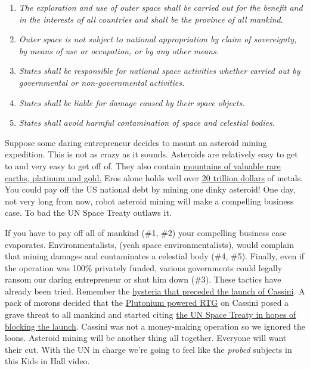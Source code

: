 \begin{enumerate}
\item
  \emph{The exploration and use of outer space shall be carried out for
  the benefit and in the interests of all countries and shall be the
  province of all mankind}.
\item
  \emph{Outer space is not subject to national appropriation by claim of
  sovereignty, by means of use or occupation, or by any other means.}
\item
  \emph{States shall be responsible for national space activities
  whether carried out by governmental or non-governmental activities.}
\item
  \emph{States shall be liable for damage caused by their space
  objects.}
\item
  \emph{States shall avoid harmful contamination of space and celestial
  bodies.}
\end{enumerate}
Suppose some daring entrepreneur decides to mount an asteroid mining
expedition. This is not as crazy as it sounds. Asteroids are relatively
easy to get to and very easy to get off of. They also contain
\href{http://news.bbc.co.uk/2/hi/sci/tech/401227.stm}{mountains of
valuable rare earths, platinum and gold.} Eros alone holds well over
\href{http://www.suite101.com/content/economic-impact-of-asteroids-space-exploration-a187015}{20
trillion dollars} of metals. You could pay off the US national debt by
mining one dinky asteroid! One day, not very long from now, robot
asteroid mining will make a compelling business case. To bad the UN
Space Treaty outlaws it.

If you have to pay off all of mankind (\#1, \#2) your compelling
business case evaporates. Environmentalists, (yeah space
environmentalists), would complain that mining damages and contaminates
a celestial body (\#4, \#5). Finally, even if the operation was 100\%
privately funded, various governments could legally ransom our daring
entrepreneur or shut him down (\#3). These tactics have already been
tried. Remember the
\href{http://articles.latimes.com/1997/oct/01/local/me-37979}{hysteria
that preceded the launch of Cassini}. A pack of morons decided that the
\href{http://en.wikipedia.org/wiki/Radioisotope\_thermoelectric\_generator}{Plutonium
powered RTG} on Cassini posed a grave threat to all mankind and started
citing \href{http://www.animatedsoftware.com/cassini/trea9704.htm}{the
UN Space Treaty in hopes of blocking the launch}. Cassini was not a
money-making operation so we ignored the loons. Asteroid mining will be
another thing all together. Everyone will want their cut. With the UN in
charge we're going to feel like the \emph{probed} subjects in this Kids
in Hall video.

